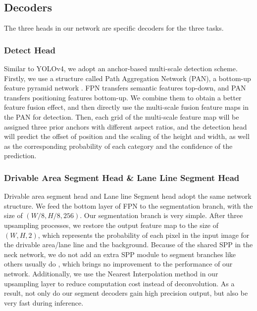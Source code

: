 \documentclass[10pt,twocolumn,letterpaper]{article}
\begin{document}
\subsection{Decoders}
The three heads in our network are specific decoders for the three tasks.

\subsubsection{Detect Head}
Similar to YOLOv4, we adopt an anchor-based multi-scale detection scheme. Firstly, we use a structure called Path Aggregation Network (PAN), a bottom-up feature pyramid network \cite{pannet}. FPN transfers semantic features top-down, and PAN transfers positioning features bottom-up. We combine them to obtain a better feature fusion effect, and then directly use the multi-scale fusion feature maps in the PAN for detection. Then, each grid of the multi-scale feature map will be assigned three prior anchors with different aspect ratios, and the detection head will predict the offset of position and the scaling of the height and width, as well as the corresponding probability of each category and the confidence of the prediction.

\subsubsection{Drivable Area Segment Head \& Lane Line Segment Head}
Drivable area segment head and Lane line Segment head adopt the same network structure. We feed the bottom layer of FPN to the segmentation branch, with the size of $(W/8,H/8,256)$. Our segmentation branch is very simple. After three upsampling processes, we restore the output feature map to the size of $(W,H,2)$, which represents the probability of each pixel in the input image for the drivable area/lane line and the background.
Because of the shared SPP in the neck network, we do not add an extra SPP module to segment branches like others usually do \cite{pspnet}, which brings no improvement to the performance of our network. Additionally, we use the Nearest Interpolation method in our upsampling layer to reduce computation cost instead of deconvolution. As a result, not only do our segment decoders gain high precision output, but also be very fast during inference.
\end{document}
